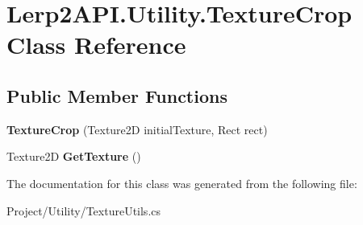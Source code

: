 \hypertarget{class_lerp2_a_p_i_1_1_utility_1_1_texture_crop}{}\section{Lerp2\+A\+P\+I.\+Utility.\+Texture\+Crop Class Reference}
\label{class_lerp2_a_p_i_1_1_utility_1_1_texture_crop}
\subsection*{Public Member Functions}
\begin{DoxyCompactItemize}
\item 
\mbox{\label{class_lerp2_a_p_i_1_1_utility_1_1_texture_crop_a6b02e7b8b9e67259ed172dd506dbeccd}} 
{\bfseries Texture\+Crop} (Texture2D initial\+Texture, Rect rect)
\item 
\mbox{\label{class_lerp2_a_p_i_1_1_utility_1_1_texture_crop_a7e6088ab1e6dd67bf128038aa76252c2}} 
Texture2D {\bfseries Get\+Texture} ()
\end{DoxyCompactItemize}


The documentation for this class was generated from the following file\+:\begin{DoxyCompactItemize}
\item 
Project/\+Utility/Texture\+Utils.\+cs\end{DoxyCompactItemize}
